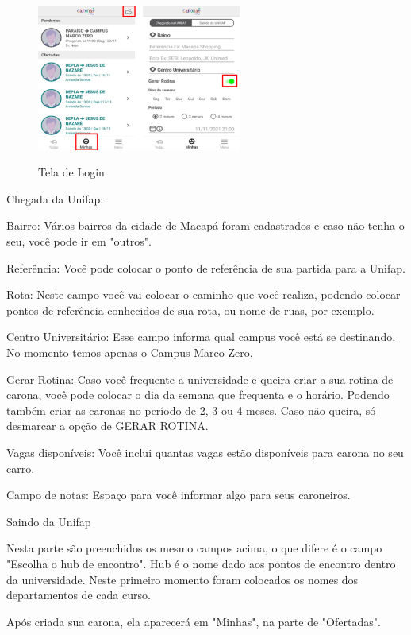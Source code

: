 \begin{figure}[H]
	\centering
	\caption{Tela de Login}
	\includegraphics[width=0.6\textwidth]{./04-figuras/manual/criacao_de_carona.png}
	\label{fig:criacao_de_carona}
\end{figure}

Chegada da Unifap:

Bairro: Vários bairros da cidade de Macapá foram cadastrados e caso não tenha o seu,
você pode ir em "outros".

Referência: Você pode colocar o ponto de referência de sua partida para a Unifap.

Rota: Neste campo você vai colocar o caminho que você realiza, podendo colocar pontos
de referência conhecidos de sua rota, ou nome de ruas, por exemplo.

Centro Universitário: Esse campo informa qual campus você está se destinando. No
momento temos apenas o Campus Marco Zero.

Gerar Rotina: Caso você frequente a universidade e queira criar a sua rotina de carona,
você pode colocar o dia da semana que frequenta e o horário. Podendo também criar as
caronas no período de 2, 3 ou 4 meses. Caso não queira, só desmarcar a opção de GERAR
ROTINA.

Vagas disponíveis: Você inclui quantas vagas estão disponíveis para carona no seu
carro.

Campo de notas: Espaço para você informar algo para seus caroneiros.

Saindo da Unifap

Nesta parte são preenchidos os mesmo campos acima, o que difere é o campo "Escolha
o hub de encontro". Hub é o nome dado aos pontos de encontro dentro da
universidade. Neste primeiro momento foram colocados os nomes dos departamentos de
cada curso.

Após criada sua carona, ela aparecerá em "Minhas", na parte de "Ofertadas".

